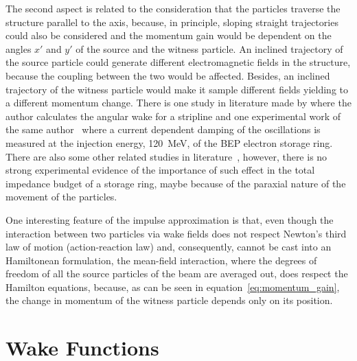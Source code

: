     The second aspect is related to the consideration that the particles traverse the structure parallel to the axis, because, in principle, sloping straight trajectories could also be considered and the momentum gain would be dependent on the angles $x'$ and $y'$ of the source and the witness particle. An inclined trajectory of the source particle could generate different electromagnetic fields in the structure, because the coupling between the two would be affected. Besides, an inclined trajectory of the witness particle would make it sample different fields yielding to a different momentum change. There is one study in literature made by  where the author calculates the angular wake for a stripline and one experimental work of the same author~\cite{Danilov1993} where a current dependent damping of the oscillations is measured at the injection energy, \SI{120}{\mega\electronvolt}, of the BEP electron storage ring. There are also some other related studies in literature~\cite{Jones1998}, however, there is no strong experimental evidence of the importance of such effect in the total impedance budget of a storage ring, maybe because of the paraxial nature of the movement of the particles.

    One interesting feature of the impulse approximation is that, even though the interaction between two particles via wake fields does not respect Newton's third law of motion (action-reaction law) and, consequently, cannot be cast into an Hamiltonean formulation, the mean-field interaction, where the degrees of freedom of all the source particles of the beam are averaged out, does respect the Hamilton equations, because, as can be seen in equation~\eqref{eq:momentum_gain}, the change in momentum of the witness particle depends only on its position.

\section{Wake Functions}\label{sec:wake_functions}

